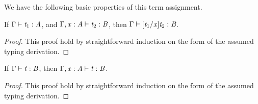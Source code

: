 We have the following basic properties of this term assignment.
\begin{lemma}
  \label{lemma:substitution_for_typing}
  If $\Gamma  \vdash  \mathit{t_{{\mathrm{1}}}}  :  \mathit{A}$, and $\Gamma  ,  \mathit{x}  :  \mathit{A}  \vdash  \mathit{t_{{\mathrm{2}}}}  :  \mathit{B}$, then $\Gamma  \vdash  [  \mathit{t_{{\mathrm{1}}}}  /  \mathit{x}  ]  \mathit{t_{{\mathrm{2}}}}  :  \mathit{B}$.
\end{lemma}
\begin{proof}
  This proof hold by straightforward induction on the
  form of the assumed typing derivation.  
\end{proof}

\begin{lemma}[Weakening]
  \label{lemma:weakening}
  If $\Gamma  \vdash  \mathit{t}  :  \mathit{B}$, then $\Gamma  ,  \mathit{x}  :  \mathit{A}  \vdash  \mathit{t}  :  \mathit{B}$.
\end{lemma}
\begin{proof}
  This proof hold by straightforward induction on the
  form of the assumed typing derivation. 
\end{proof}

